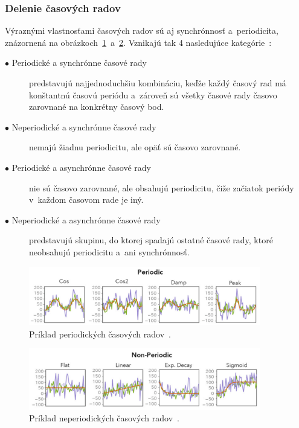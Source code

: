 \documentclass[a4paper,twoside,slovak,12pt,appendix]{article}
\begin{document}
\subsubsection{Delenie časových radov}
Výraznými vlastnosťami časových radov sú aj synchrónnosť a~periodicita,
znázornená na
obrázkoch~\ref{fig:periodic-time-series}~a~\ref{fig:non-periodic-time-series}.
Vznikajú tak 4 nasledujúce kategórie~\cite{Teng2010}:
\begin{description}
  \item[$\bullet$ Periodické a synchrónne časové rady] predstavujú
	najjednoduchšiu kombináciu, keďže každý časový rad má konštantnú časovú
	periódu a~zároveň sú všetky časové rady časovo zarovnané na konkrétny časový
	bod.
  \item[$\bullet$ Neperiodické a synchrónne časové rady] nemajú žiadnu
	periodicitu, ale opäť sú časovo zarovnané.
  \item[$\bullet$ Periodické a asynchrónne časové rady] nie sú časovo zarovnané,
	ale obsahujú periodicitu, čiže začiatok periódy v~každom časovom rade je iný.
  \item[$\bullet$ Neperiodické a asynchrónne časové rady] predstavujú skupinu,
	do ktorej spadajú ostatné časové rady, ktoré neobsahujú periodicitu a~ani
	synchrónnosť.
\end{description}

\begin{figure}[H]
  \centering
  \includegraphics[width=0.9\textwidth]{periodic_time_series.png}
  \caption{Príklad periodických časových radov~\cite{Perea2015}.}
  \label{fig:periodic-time-series}
\end{figure}

\begin{figure}[H]
  \centering
  \includegraphics[width=0.9\textwidth]{non_periodic_time_series.png}
  \caption{Príklad neperiodických časových radov~\cite{Perea2015}.}
  \label{fig:non-periodic-time-series}
\end{figure}
\end{document}
